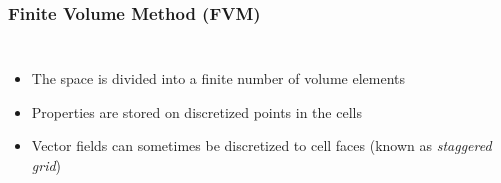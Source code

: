 
\begin{frame}
\frametitle{Finite Volume Method (FVM)}
\begin{columns}[c]

\begin{itemize}[<+(1)->]
\item The space is divided into a finite number of volume elements
\item Properties are stored on discretized points in the cells
\setcounter{nonstaggeredpauses}{\thebeamerpauses}
\item Vector fields can sometimes be discretized to cell faces (known as \emph{staggered grid})
\setcounter{staggeredpauses}{\thebeamerpauses}
\end{itemize}



\end{columns}
\end{frame}
